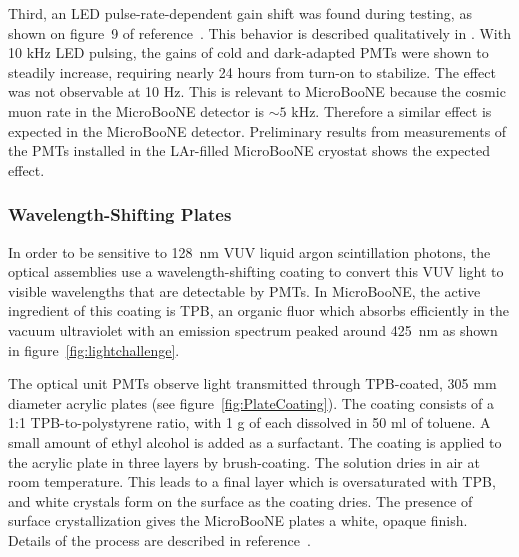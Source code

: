 Third, an LED pulse-rate-dependent gain shift was found during testing, as shown on figure~9 of reference~\cite{Briese:2013wua}.  This behavior is described qualitatively in \cite{HamamatsuBook}.  With 10 kHz LED pulsing, the gains of cold and dark-adapted PMTs were shown to steadily increase, requiring nearly 24 hours from turn-on to stabilize. The effect was not observable at 10 Hz.   This is relevant to MicroBooNE because the
cosmic muon rate in the MicroBooNE detector is $\sim 5$ kHz.  Therefore a similar effect is expected in the MicroBooNE detector.  Preliminary results from measurements of the PMTs installed in the LAr-filled MicroBooNE cryostat shows the expected effect. 



\subsubsection{Wavelength-Shifting Plates}
\label{sec:wavelengthshift}


In order to be sensitive to 128~nm VUV liquid argon scintillation photons, the optical assemblies use a wavelength-shifting coating to convert this VUV light to visible wavelengths that are detectable by PMTs.  In MicroBooNE, the active ingredient of this coating is TPB, an organic fluor which absorbs efficiently in the vacuum ultraviolet with an emission spectrum peaked around 425~nm \cite{Burton:1973} as shown in figure~\ref{fig:lightchallenge}. 

The optical unit PMTs observe light transmitted through TPB-coated, 305 mm diameter acrylic plates (see figure~\ref{fig:PlateCoating}).
The coating consists of a 1:1 TPB-to-polystyrene ratio, with 1 g of each dissolved in 50 ml of toluene.  A small amount of ethyl alcohol is added as a surfactant.
The coating is applied to the acrylic plate in three layers by brush-coating.  The solution dries in air at room temperature.
This leads to a final layer which is oversaturated with TPB, and white crystals form on the surface as the coating dries.  The presence of surface crystallization gives the MicroBooNE plates a white, opaque finish. Details of the process are described in reference~\cite{Ignarra:2014yqa}.

